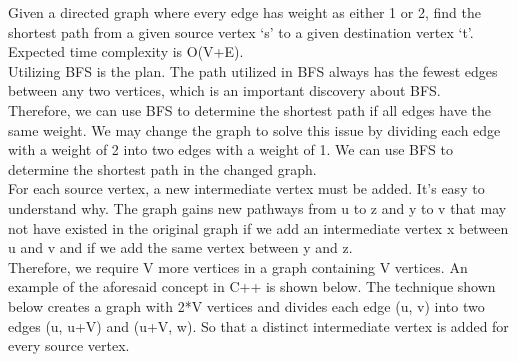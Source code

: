 \documentclass{article}
\begin{document}
\begin{enumerate}
Given a directed graph where every edge has weight as either 1 or 2, find the shortest path from a given source vertex ‘s’ to a given destination vertex ‘t’. Expected time complexity is O(V+E).\\
Utilizing BFS is the plan. The path utilized in BFS always has the fewest edges between any two vertices, which is an important discovery about BFS. \\
Therefore, we can use BFS to determine the shortest path if all edges have the same weight. We may change the graph to solve this issue by dividing each edge with a weight of 2 into two edges with a weight of 1. We can use BFS to determine the shortest path in the changed graph.\\
For each source vertex, a new intermediate vertex must be added. It's easy to understand why. The graph gains new pathways from u to z and y to v that may not have existed in the original graph if we add an intermediate vertex x between u and v and if we add the same vertex between y and z.\\
Therefore, we require V more vertices in a graph containing V vertices. An example of the aforesaid concept in C++ is shown below. The technique shown below creates a graph with 2*V vertices and divides each edge (u, v) into two edges (u, u+V) and (u+V, w). So that a distinct intermediate vertex is added for every source vertex.\\


\end{enumerate}
\end{document}
